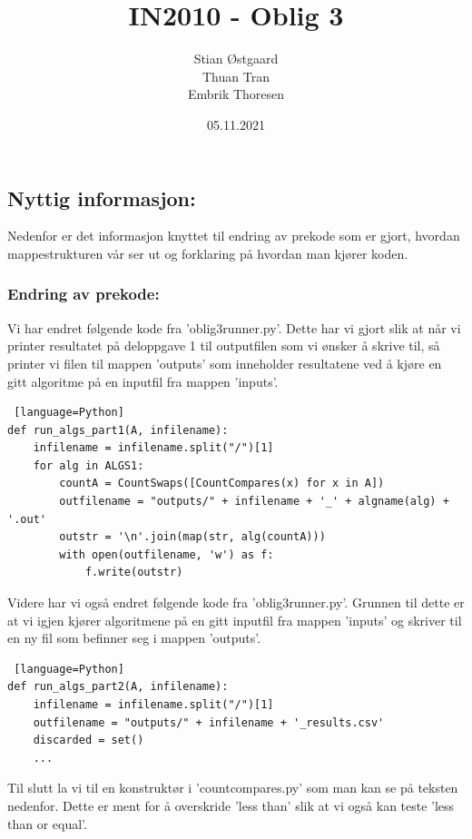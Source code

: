 \documentclass[a4paper, article, oneside, norsk]{memoir} %
\title{IN2010 - Oblig 3}
\author{Stian Østgaard \\ Thuan Tran \\
Embrik Thoresen}
\date{05.11.2021}
\newcommand{\0}{\mathbf{0}}
\newcommand{\1}{\mathbf{1}}
\begin{document}
\maketitle

\subsection*{Nyttig informasjon:}
Nedenfor er det informasjon knyttet til endring av prekode som er gjort, hvordan mappestrukturen vår ser ut og forklaring på hvordan man kjører koden.
\\ 
\subsubsection*{Endring av prekode:}
Vi har endret følgende kode fra 'oblig3runner.py'. Dette har vi gjort slik at når vi printer resultatet på deloppgave 1 til outputfilen som vi ønsker å skrive til, så printer vi filen til mappen 'outputs' som inneholder resultatene ved å kjøre en gitt algoritme på en inputfil fra mappen 'inputs'.

\begin{lstlisting} [language=Python]
def run_algs_part1(A, infilename):
    infilename = infilename.split("/")[1]
    for alg in ALGS1:
        countA = CountSwaps([CountCompares(x) for x in A])
        outfilename = "outputs/" + infilename + '_' + algname(alg) + '.out'
        outstr = '\n'.join(map(str, alg(countA)))
        with open(outfilename, 'w') as f:
            f.write(outstr)
\end{lstlisting}

Videre har vi også endret følgende kode fra 'oblig3runner.py'. Grunnen til dette er at vi igjen kjører algoritmene på en gitt inputfil fra mappen 'inputs' og skriver til en ny fil som befinner seg i mappen 'outputs'.

\begin{lstlisting} [language=Python]
def run_algs_part2(A, infilename):
    infilename = infilename.split("/")[1]
    outfilename = "outputs/" + infilename + '_results.csv'
    discarded = set()
   	...
\end{lstlisting}

Til slutt la vi til en konstruktør i 'countcompares.py' som man kan se på teksten nedenfor. Dette er ment for å overskride 'less than' slik at vi også kan teste 'less than or equal'.
\end{document}
